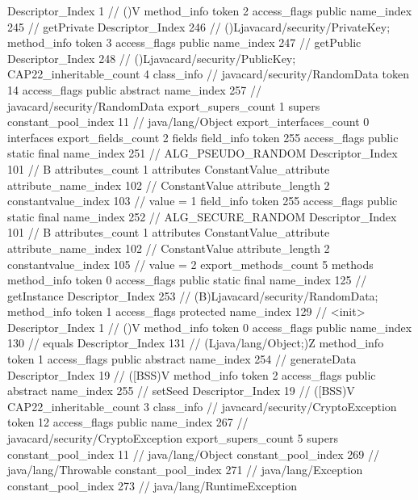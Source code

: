 {{{{{					Descriptor_Index	1		// ()V
				}
				method_info {
					token	2
					access_flags	public
					name_index	245		// getPrivate
					Descriptor_Index	246		// ()Ljavacard/security/PrivateKey;
				}
				method_info {
					token	3
					access_flags	public
					name_index	247		// getPublic
					Descriptor_Index	248		// ()Ljavacard/security/PublicKey;
				}
			}
			CAP22_inheritable_count	4
		}
		class_info {		// javacard/security/RandomData
			token	14
			access_flags	public abstract
			name_index	257		// javacard/security/RandomData
			export_supers_count	1
			supers {
				constant_pool_index	11		// java/lang/Object
			}
			export_interfaces_count	0
			interfaces {
			}
			export_fields_count	2
			fields {
			field_info {
				token	255
				access_flags	public static final
				name_index	251		// ALG_PSEUDO_RANDOM
				Descriptor_Index	101		// B
				attributes_count	1
				attributes {
				ConstantValue_attribute {
					attribute_name_index	102		// ConstantValue
					attribute_length	2
					constantvalue_index	103		// value = 1
				}
				}
			}
			field_info {
				token	255
				access_flags	public static final
				name_index	252		// ALG_SECURE_RANDOM
				Descriptor_Index	101		// B
				attributes_count	1
				attributes {
				ConstantValue_attribute {
					attribute_name_index	102		// ConstantValue
					attribute_length	2
					constantvalue_index	105		// value = 2
				}
				}
			}
			}
			export_methods_count	5
			methods {
				method_info {
					token	0
					access_flags	public static final
					name_index	125		// getInstance
					Descriptor_Index	253		// (B)Ljavacard/security/RandomData;
				}
				method_info {
					token	1
					access_flags	protected
					name_index	129		// <init>
					Descriptor_Index	1		// ()V
				}
				method_info {
					token	0
					access_flags	public
					name_index	130		// equals
					Descriptor_Index	131		// (Ljava/lang/Object;)Z
				}
				method_info {
					token	1
					access_flags	public abstract
					name_index	254		// generateData
					Descriptor_Index	19		// ([BSS)V
				}
				method_info {
					token	2
					access_flags	public abstract
					name_index	255		// setSeed
					Descriptor_Index	19		// ([BSS)V
				}
			}
			CAP22_inheritable_count	3
		}
		class_info {		// javacard/security/CryptoException
			token	12
			access_flags	public
			name_index	267		// javacard/security/CryptoException
			export_supers_count	5
			supers {
				constant_pool_index	11		// java/lang/Object
				constant_pool_index	269		// java/lang/Throwable
				constant_pool_index	271		// java/lang/Exception
				constant_pool_index	273		// java/lang/RuntimeException
}}}}
